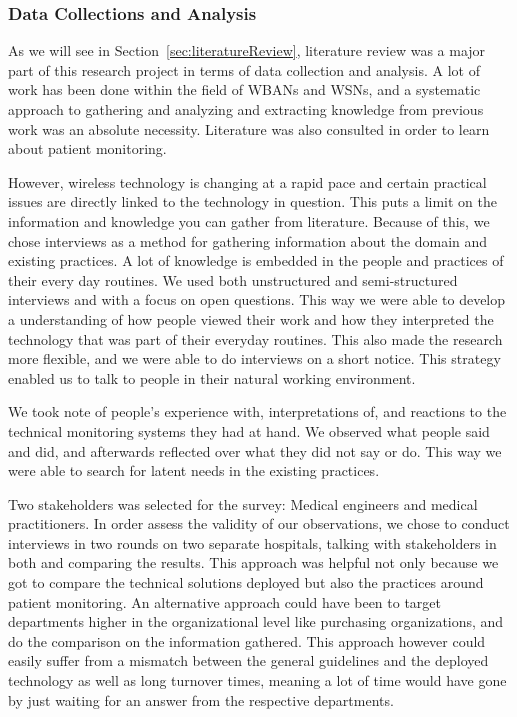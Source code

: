 
\subsubsection{Data Collections and Analysis} %
\label{ssub:data_collections_and_analysis}

As we will see in Section~\ref{sec:literatureReview}, literature review was a major part of this research project in terms of data collection and analysis. A lot of work has been done within the field of WBANs and WSNs, and a systematic approach to gathering and analyzing and extracting knowledge from previous work was an absolute necessity. Literature was also consulted in order to learn about patient monitoring.

However, wireless technology is changing at a rapid pace and certain practical issues are directly linked to the technology in question. This puts a limit on the information and knowledge you can gather from literature. Because of this, we chose interviews as a method for gathering information about the domain and existing practices. A lot of knowledge is embedded in the people and practices of their every day routines. We used both unstructured and semi-structured interviews and with a focus on open questions. This way we were able to develop a understanding of how people viewed their work and how they interpreted the technology that was part of their everyday routines. This also made the research more flexible, and we were able to do interviews on a short notice. This strategy enabled us to talk to people in their natural working environment.

We took note of people's experience with, interpretations of, and reactions to the technical monitoring systems they had at hand. We observed what people said and did, and afterwards reflected over what they did not say or do. This way we were able to search for latent needs in the existing practices. 

Two stakeholders was selected for the survey: Medical engineers and medical practitioners. In order assess the validity of our observations, we chose to conduct interviews in two rounds on two separate hospitals, talking with stakeholders in both and comparing the results. This approach was helpful not only because we got to compare the technical solutions deployed but also the practices around patient monitoring. An alternative approach could have been to target departments higher in the organizational level like purchasing organizations, and do the comparison on the information gathered. This approach however could easily suffer from a mismatch between the general guidelines and the deployed technology as well as long turnover times, meaning a lot of time would have gone by just waiting for an answer from the respective departments.



